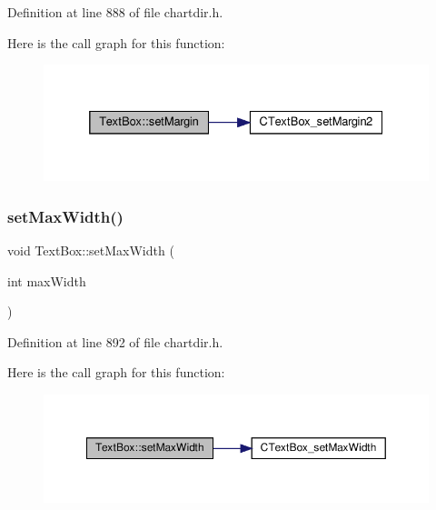Definition at line 888 of file chartdir.\+h.

Here is the call graph for this function\+:
\nopagebreak
\begin{figure}[H]
\begin{center}
\leavevmode
\includegraphics[width=332pt]{class_text_box_a4e56a85bbd89b369c13d9f9e571f1950_cgraph}
\end{center}
\end{figure}
\mbox{\label{class_text_box_a416f789fcda6ac8bf598739808a1fc43}} 
\subsubsection{\texorpdfstring{set\+Max\+Width()}{setMaxWidth()}}
{\footnotesize\ttfamily void Text\+Box\+::set\+Max\+Width (\begin{DoxyParamCaption}\item[{int}]{max\+Width }\end{DoxyParamCaption})\hspace{0.3cm}{\ttfamily [inline]}}



Definition at line 892 of file chartdir.\+h.

Here is the call graph for this function\+:
\nopagebreak
\begin{figure}[H]
\begin{center}
\leavevmode
\includegraphics[width=350pt]{class_text_box_a416f789fcda6ac8bf598739808a1fc43_cgraph}
\end{center}
\end{figure}
\mbox{\label{class_text_box_a29307e42860b1de681bbf02e58c1ee8e}} 
